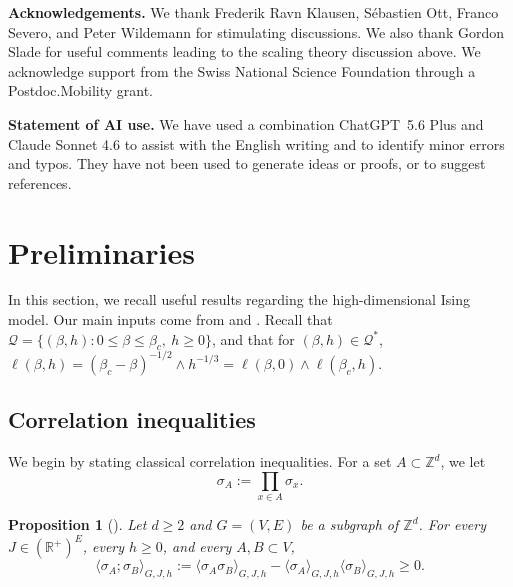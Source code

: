 \documentclass[11pt,a4paper]{article}
\numberwithin{equation}{section}
\theoremstyle{plain}
\newtheorem{Prop}[Thm]{Proposition}
\theoremstyle{definition}
\begin{document}
\hfill

\noindent \textbf{Acknowledgements.} We thank Frederik Ravn Klausen, S\'ebastien Ott, Franco Severo, and Peter Wildemann for stimulating discussions. We also thank Gordon Slade for useful comments leading to the scaling theory discussion above. We acknowledge support from the Swiss National Science Foundation through a Postdoc.Mobility grant.

\hfill

\noindent\textbf{Statement of AI use.} We have used a combination ChatGPT~5.6 Plus and Claude Sonnet 4.6 to assist with the English writing and to identify minor 
errors and typos. They have not been used to generate ideas or proofs, or to 
suggest references.


\section{Preliminaries}\label{sec:preliminaries}
In this section, we recall useful results regarding the high-dimensional Ising model. Our main inputs come from \cite{AizenmanFernandezCriticalBehaviorMagnetization1986} and \cite{DuminilPanis2024newLB}. Recall that $\mathcal Q=\{(\beta,h): 0\leq\beta\leq \beta_c,\: h\geq 0\}$, and that for $(\beta,h)\in \mathcal Q^*$, 
$\ell(\beta,h)=(\beta_c-\beta)^{-1/2}\wedge h^{-1/3}=\ell(\beta,0)\wedge \ell(\beta_c,h)$.

\subsection{Correlation inequalities}

We begin by stating classical correlation inequalities. For a set $A\subset \mathbb Z^d$, we let 
\begin{equation}
\sigma_A:=\prod_{x\in A}\sigma_x.
\end{equation} 

\begin{Prop}[]\label{prop:secondineqGriffiths} Let $d\geq 2$ and $G=(V,E)$ be a subgraph of $\mathbb Z^d$. For every $J\in (\mathbb R^+)^{E}$, every $h\geq 0$, and every $A,B\subset V$,
\begin{equation}
	\langle \sigma_A;\sigma_B\rangle_{G,J,h}:=\langle \sigma_A\sigma_B\rangle_{G,J,h}-\langle \sigma_A\rangle_{G,J,h}\langle \sigma_B\rangle_{G,J,h}
\geq 0.
\end{equation}
\end{Prop}
\end{document}
